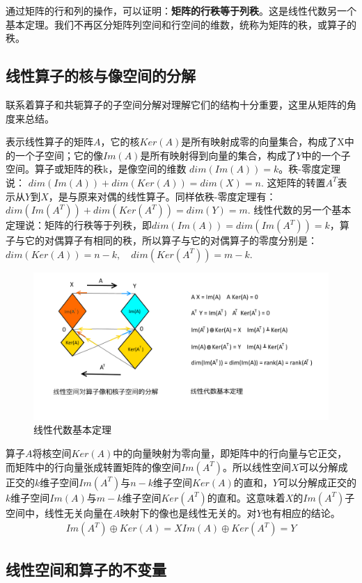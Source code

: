 	通过矩阵的行和列的操作，可以证明：\textbf{矩阵的行秩等于列秩}。这是线性代数另一个基本定理。我们不再区分矩阵列空间和行空间的维数，统称为矩阵的秩，或算子的秩。
	
	\subsection{线性算子的核与像空间的分解}
	
	联系着算子和共轭算子的子空间分解对理解它们的结构十分重要，这里从矩阵的角度来总结。
	
	表示线性算子的矩阵$ A $，它的核$ Ker(A) $是所有映射成零的向量集合，构成了X中的一个子空间；它的像$ Im(A) $是所有映射得到向量的集合，构成了$ Y $中的一个子空间。算子或矩阵的秩k，是像空间的维数 $ dim(Im(A)) = k $。秩-零度定理说： $ dim(Im(A))+dim(Ker(A)) = dim(X) = n $. 这矩阵的转置$ A^T $表示从$ Y $到$ X $，是与原来对偶的线性算子。同样依秩-零度定理有：$ dim(Im(A^T)) + dim(Ker(A^T)) = dim(Y) = m $. 线性代数的另一个基本定理说：矩阵的行秩等于列秩，即$ dim(Im(A)) = dim(Im(A^T)) = k $，算子与它的对偶算子有相同的秩，所以算子与它的对偶算子的零度分别是：
		$ dim(Ker(A)) = n-k,\quad dim(Ker(A^T)) = m-k $. 
	
	\begin{figure}[h]
		\centering
		\includegraphics[width=0.7\linewidth]{pic/1604494yzy1do1yro41gva.png}
		\caption{线性代数基本定理}
		\label{1604494yzy1do1yro41gva}
	\end{figure}

	算子$ A $将核空间$ Ker(A) $中的向量映射为零向量，即矩阵中的行向量与它正交，而矩阵中的行向量张成转置矩阵的像空间$ Im(A^T) $。所以线性空间$ X $可以分解成正交的$ k $维子空间$ Im(A^T) $与$ n-k $维子空间$ Ker(A) $的直和，$ Y $可以分解成正交的$ k $维子空间$ Im(A) $与$ m-k $维子空间$ Ker(A^T) $的直和。这意味着$ X $的$ Im(A^T) $子空间中，线性无关向量在$ A $映射下的像也是线性无关的。对$ Y $也有相应的结论。
	\begin{gather*}
		Im(A^T)\oplus Ker(A)=X  Im(A)\oplus Ker(A^T)=Y
	\end{gather*}
	
	\subsection{线性空间和算子的不变量}
	
